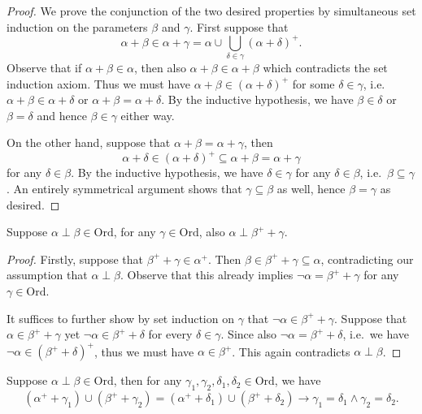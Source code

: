 \documentclass[12pt,openany]{book}
\theoremstyle{plain}
\theoremstyle{definition}
\newcommand\Ord{\mathrm{Ord}}
\begin{document}
\begin{proof}
  We prove the conjunction of the two desired properties by simultaneous set induction on the parameters $\beta$ and $\gamma$. First suppose that
  \[\alpha + \beta \in \alpha + \gamma = \alpha \cup \bigcup_{\delta \in \gamma} \left(\alpha + \delta\right)^+.\]
  Observe that if $\alpha + \beta \in \alpha$, then also $\alpha + \beta \in \alpha + \beta$ which contradicts the set induction axiom. Thus we must have $\alpha + \beta \in \left(\alpha + \delta\right)^+$ for some $\delta \in \gamma$, i.e.\ $\alpha + \beta \in \alpha + \delta$ or $\alpha + \beta = \alpha + \delta$. By the inductive hypothesis, we have $\beta \in \delta$ or $\beta = \delta$ and hence $\beta \in \gamma$ either way.

  On the other hand, suppose that $\alpha + \beta = \alpha + \gamma$, then
  \[\alpha + \delta \in \left(\alpha + \delta\right)^+ \subseteq \alpha + \beta = \alpha + \gamma\]
  for any $\delta \in \beta$. By the inductive hypothesis, we have $\delta \in \gamma$ for any $\delta \in \beta$, i.e.\ $\beta \subseteq \gamma$. An entirely symmetrical argument shows that $\gamma \subseteq \beta$ as well, hence $\beta = \gamma$ as desired.
\end{proof}

\begin{lemma}
  \label{lem:set-perp-plus-still-perp}
  Suppose $\alpha \perp \beta \in \Ord$, for any $\gamma \in \Ord$, also $\alpha \perp \beta^+ + \gamma$.
\end{lemma}

\begin{proof}
  Firstly, suppose that $\beta^+ + \gamma \in \alpha^+$. Then $\beta \in \beta^+ + \gamma \subseteq \alpha$, contradicting our assumption that $\alpha \perp \beta$. Observe that this already implies $\neg \alpha = \beta^+ + \gamma$ for any $\gamma \in \Ord$.

  It suffices to further show by set induction on $\gamma$ that $\neg \alpha \in \beta^+ + \gamma$. Suppose that $\alpha \in \beta^+ + \gamma$ yet $\neg \alpha \in \beta^+ + \delta$ for every $\delta \in \gamma$. Since also $\neg \alpha = \beta^+ + \delta$, i.e.\ we have $\neg \alpha \in \left(\beta^+ + \delta\right)^+$, thus we must have $\alpha \in \beta^+$. This again contradicts $\alpha \perp \beta$.
\end{proof}

\begin{corollary}
  \label{cor:set-perp-ord-pair}
  Suppose $\alpha \perp \beta \in \Ord$, then for any $\gamma_1, \gamma_2, \delta_1, \delta_2 \in \Ord$, we have
  \[\left(\alpha^+ + \gamma_1\right) \cup \left(\beta^+ + \gamma_2\right) = \left(\alpha^+ + \delta_1\right) \cup \left(\beta^+ + \delta_2\right) \rightarrow \gamma_1 = \delta_1 \land \gamma_2 = \delta_2.\]
\end{corollary}
\end{document}
